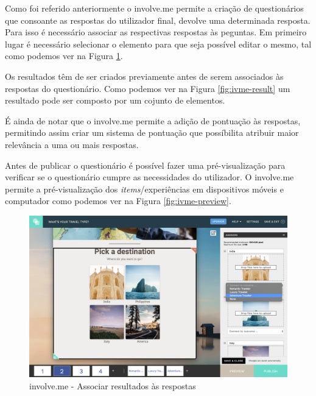 Como foi referido anteriormente o involve.me permite a criação de questionários que consoante as respostas do utilizador final, devolve uma determinada resposta. Para isso é necessário associar as respectivas respostas às peguntas. Em primeiro lugar é necessário selecionar o elemento para que seja possível editar o mesmo, tal como podemos ver na Figura \ref{fig:ivme-associar}.

Os resultados têm de ser criados previamente antes de serem associados às respostas do questionário. Como podemos ver na Figura \ref{fig:ivme-result} um resultado pode ser composto por um cojunto de elementos. 

É ainda de notar que o involve.me permite a adição de pontuação às respostas, permitindo assim criar um sistema de pontuação que possíbilita atribuir maior relevância a uma ou mais respostas.

 Antes de publicar o questionário é possível fazer uma pré-visualização para verificar se o questionário cumpre as necessidades do utilizador. O involve.me permite a pré-visualização dos \textit{items}/experiências em dispositivos móveis e computador como podemos ver na Figura \ref{fig:ivme-preview}.
 
\newpage
\begin{figure}[ht!]
	\begin{center}
		\includegraphics[width=1\textwidth]{img/ivme/associar}
		\caption{involve.me - Associar resultados às respostas}
		\label{fig:ivme-associar}
	\end{center}
\end{figure}

